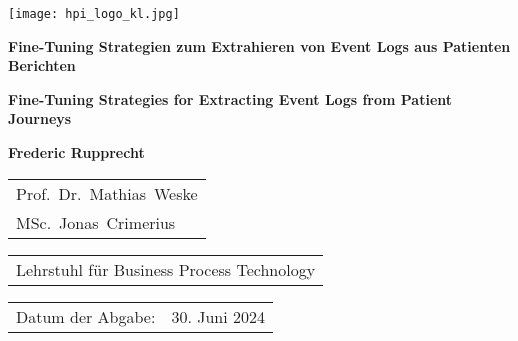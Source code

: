 \begin{titlepage}
	\begin{flushright}
		\texttt{[image: hpi\_logo\_kl.jpg]}
	\end{flushright}
	\begin{center}
		\hbox{}
		\vfill
		{\huge\bfseries Fine-Tuning Strategien zum Extrahieren von Event Logs aus Patienten Berichten \par}
		\vskip 0.5cm
		{\huge\bfseries Fine-Tuning Strategies for Extracting Event Logs from Patient Journeys \par}
		\vskip 1.5cm
		\textbf{Frederic Rupprecht}\\
		\vskip 1.5cm
		\begin{tabular}{l}
			Prof.~Dr.~Mathias~Weske \\
			MSc.~Jonas~Crimerius \\
		\end{tabular}
		\vskip 0.25cm
		\begin{tabular}{l}
			Lehrstuhl für Business Process Technology
		\end{tabular}
		\vskip 1.5cm
		\begin{tabular}{ll}
			Datum der Abgabe: & 30. Juni 2024 \\
		\end{tabular}
	\end{center}	
	\vfill
\end{titlepage}

